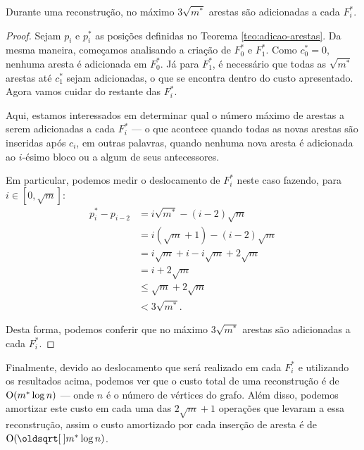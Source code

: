 \begin{theorem}
    \label{teo:deslocamento}
    Durante uma reconstrução, no máximo $3 \sqrt{m^*}$ arestas são adicionadas a cada $F_i^*$.
\end{theorem}
\begin{proof}
    Sejam $p_i$ e $p_i^*$ as posições definidas no Teorema \ref{teo:adicao-arestas}. Da mesma maneira, começamos analisando a criação de $F_0^*$ e $F_1^*$. Como $c_0^* = 0$, nenhuma aresta é adicionada em $F_0^*$. Já para $F_1^*$, é necessário que todas as $\sqrt{m^*}$ arestas até $c_1^*$ sejam adicionadas, o que se encontra dentro do custo apresentado. Agora vamos cuidar do restante das $F_i^*$.

    Aqui, estamos interessados em determinar qual o número máximo de arestas a serem adicionadas a cada $F_i^*$ --- o que acontece quando todas as novas arestas são inseridas após $c_i$, em outras palavras, quando nenhuma nova aresta é adicionada ao $i$-ésimo bloco ou a algum de seus antecessores.

    Em particular, podemos medir o deslocamento de $F_i^*$ neste caso fazendo, para $i \in [0, \sqrt{m}]$:
    \begin{align*}
        p_i^* - p_{i-2} & = i\sqrt{m^*} - (i-2)\sqrt{m}           \\
                        & = i(\sqrt{m}+1) - (i-2)\sqrt{m}         \\
                        & = i\sqrt{m} + i - i\sqrt{m} + 2\sqrt{m} \\
                        & = i + 2\sqrt{m}                         \\
                        & \leq \sqrt{m} + 2\sqrt{m}               \\
                        & < 3\sqrt{m^*}.
    \end{align*}

    Desta forma, podemos conferir que no máximo $3 \sqrt{m^*}$ arestas são adicionadas a cada $F_i^*$.
\end{proof}

Finalmente, devido ao deslocamento que será realizado em cada $F_i^*$ e utilizando os resultados acima, podemos ver que o custo total de uma reconstrução é de $\mathrm{O}(m^* \log{n})$ --- onde $n$ é o número de vértices do grafo. Além disso, podemos amortizar este custo em cada uma das $2\sqrt{m} + 1$ operações que levaram a essa reconstrução, assim o custo amortizado por cada inserção de aresta é de $\Oh(\sqrt{m^*} \log{n})$.

